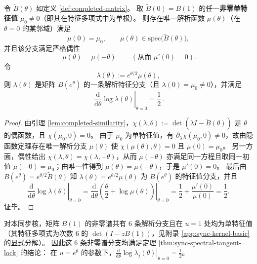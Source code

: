 \begin{theorem}[谱切线锁定：\texorpdfstring{$u=1$}{u=1} 处全谱对数斜率恒为 \texorpdfstring{$1/2$}{1/2}]\label{thm:sync-spectral-tangent-lock}
令 \(\widetilde B(\theta)\) 如定义 \ref{def:completed-matrix}。
取 \(\widetilde B(0)=B(1)\) 的任一\textbf{非零单特征值} \(\mu_0\neq 0\)（即其在特征多项式中为单根）。
则存在唯一解析函数 \(\mu(\theta)\)（在 \(\theta=0\) 的某邻域）满足
\[
\mu(0)=\mu_0,\qquad \mu(\theta)\in\mathrm{spec}\bigl(\widetilde B(\theta)\bigr),
\]
并且该分支满足严格偶性
\[
\boxed{\ \mu(\theta)=\mu(-\theta)\ } \qquad(\text{从而 } \mu'(0)=0).
\]
令
\[
\lambda(\theta):=e^{\theta/2}\mu(\theta),
\]
则 \(\lambda(\theta)\) 是矩阵 \(B(e^{\theta})\) 的一条解析特征分支（且 \(\lambda(0)=\mu_0\neq 0\)），并满足
\[
\boxed{\ \left.\frac{\mathrm{d}}{\mathrm{d}\theta}\log\lambda(\theta)\right|_{\theta=0}=\frac12\ }.
\]
\end{theorem}
\begin{proof}
由引理 \ref{lem:completed-similarity}，\(\chi(\lambda,\theta):=\det(\lambda I-\widetilde B(\theta))\) 是 \(\theta\) 的偶函数，且 \(\chi(\mu_0,0)=0\)。
由于 \(\mu_0\) 为单特征值，有 \(\partial_\lambda\chi(\mu_0,0)\neq 0\)，故由隐函数定理存在唯一解析分支 \(\mu(\theta)\) 使 \(\chi(\mu(\theta),\theta)=0\) 且 \(\mu(0)=\mu_0\)。
另一方面，偶性给出 \(\chi(\lambda,\theta)=\chi(\lambda,-\theta)\)，从而 \(\mu(-\theta)\) 亦满足同一方程且取同一初值 \(\mu(-0)=\mu_0\)；由唯一性得到 \(\mu(\theta)=\mu(-\theta)\)，于是 \(\mu'(0)=0\)。
最后由 \(B(e^\theta)=e^{\theta/2}\widetilde B(\theta)\) 知 \(\lambda(\theta)=e^{\theta/2}\mu(\theta)\) 为 \(B(e^\theta)\) 的特征值分支，并且
\[
\left.\frac{\mathrm{d}}{\mathrm{d}\theta}\log\lambda(\theta)\right|_{\theta=0}
=\left.\frac{\mathrm{d}}{\mathrm{d}\theta}\left(\frac{\theta}{2}+\log\mu(\theta)\right)\right|_{\theta=0}
=\frac12+\frac{\mu'(0)}{\mu(0)}
=\frac12.
\]
证毕。
\end{proof}

\begin{corollary}[同步核的 \texorpdfstring{$6$}{6} 条非零谱分支在 \texorpdfstring{$u=1$}{u=1} 处同时锁定]\label{cor:sync-spectral-tangent-lock-6}
对本同步核，矩阵 \(B(1)\) 的非零谱共有 \(6\) 条解析分支且在 \(u=1\) 处均为单特征值（其特征多项式为次数 \(6\) 的 \(\det(I-zB(1))\)，见附录 \ref{app:sync-kernel-basic} 的显式分解）。
因此这 \(6\) 条非零谱分支均满足定理 \ref{thm:sync-spectral-tangent-lock} 的结论：
在 \(u=e^\theta\) 的参数下，\(\left.\frac{\mathrm{d}}{\mathrm{d}\theta}\log\lambda_j(\theta)\right|_{\theta=0}=\frac12\)。
\end{corollary}

